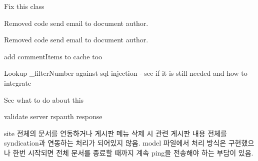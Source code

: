 
\begin{DoxyRefList}
\item[\label{todo__todo000003}%
\hypertarget{todo__todo000003}{}%
Namespace \hyperlink{namespaceclasses}{classes} ]Fix this class  
\item[\label{todo__todo000005}%
\hypertarget{todo__todo000005}{}%
Member \hyperlink{classcommentAdminController_a70bde7bc9124b72df7bdf6bf09633148}{comment\-Admin\-Controller\-:\-:proc\-Comment\-Admin\-Change\-Status} ()]Removed code send email to document author.  
\item[\label{todo__todo000006}%
\hypertarget{todo__todo000006}{}%
Member \hyperlink{classcommentController_a36736562b092a021301ec11a61310e68}{comment\-Controller\-:\-:send\-Email\-To\-Admin\-After\-Insert\-Comment} (\$obj)]Removed code send email to document author.  
\item[\label{todo__todo000007}%
\hypertarget{todo__todo000007}{}%
Member \hyperlink{classcommentModel_a89492b8f475e42296e1560b8886bdc01}{comment\-Model\-:\-:get\-Newest\-Comment\-List} (\$obj, \$column\-List=array())]add comment\-Items to cache too  
\item[\label{todo__todo000002}%
\hypertarget{todo__todo000002}{}%
Member \hyperlink{classDBMssql_aa3f04ce5bee8d9e11db7de7293055fef}{D\-B\-Mssql\-:\-:\-\_\-execute\-Insert\-Act} (\$query\-Object)]Lookup \-\_\-filter\-Number against sql injection -\/ see if it is still needed and how to integrate  
\item[\label{todo__todo000001}%
\hypertarget{todo__todo000001}{}%
Member \hyperlink{classDBMssql_ac380f1918abd17fd5cba28accfaec9fc}{D\-B\-Mssql\-:\-:add\-Quotes} (\$string)]See what to do about this  
\item[\label{todo__todo000004}%
\hypertarget{todo__todo000004}{}%
Member \hyperlink{classHTTP__Request2__Adapter__Socket_abe6b620d64a56d799cd9367aedf3c0e6}{H\-T\-T\-P\-\_\-\-Request2\-\_\-\-Adapter\-\_\-\-Socket\-:\-:update\-Challenge} (\&\$challenge, \$header\-Value)]validate server rspauth response  
\item[\label{todo__todo000008}%
\hypertarget{todo__todo000008}{}%
Class \hyperlink{classsyndication}{syndication} ]site 전체의 문서를 연동하거나 게시판 메뉴 삭제 시 관련 게시판 내용 전체를 syndication과 연동하는 처리가 되어있지 않음. model 파일에서 처리 방식은 구현했으나 한번 시작되면 전체 문서를 종료할 때까지 계속 ping을 전송해야 하는 부담이 있음. 
\end{DoxyRefList}